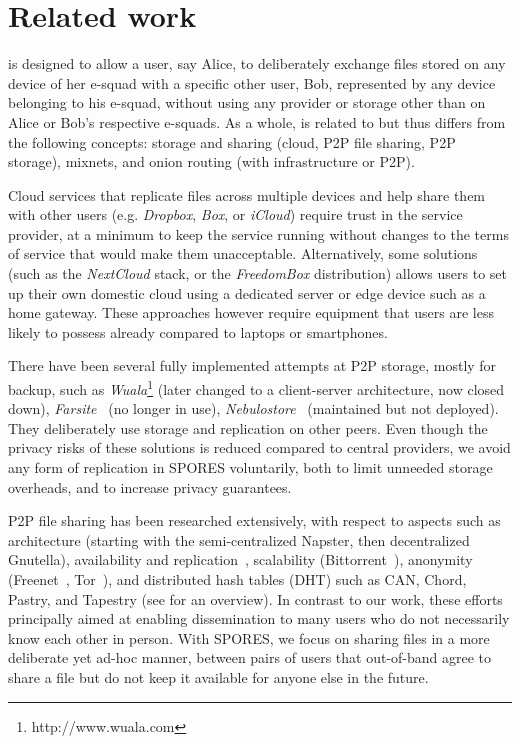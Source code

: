 \section{Related work}%
\label{RelatedWork}

\name is designed to allow a user, say Alice,  to deliberately exchange files stored on any device of her e-squad with a specific other user, Bob, represented by any device belonging to his e-squad, without using any provider or storage other than on Alice or Bob's respective e-squads. As a whole, \name is related to but thus differs from the following concepts: storage and sharing (cloud, P2P file sharing, P2P storage),  mixnets, and onion routing (with infrastructure or P2P).  

Cloud services that replicate files across multiple devices and help share them with other users (e.g. \emph{Dropbox}, \emph{Box}, or \emph{iCloud}) require trust in the service provider, at a minimum to keep the service running without changes to the terms of service that would make them unacceptable. Alternatively, some solutions (such as the \emph{NextCloud} stack, or the \emph{FreedomBox} distribution) allows users to set up their own domestic cloud using a dedicated server or edge device such as a home gateway. These approaches however require equipment that users are less likely to possess already compared to laptops or smartphones. 

There have been several fully implemented attempts at P2P storage, mostly for backup, such as \emph{Wuala}\footnote{http://www.wuala.com} (later changed to a client-server architecture, now closed down), \emph{Farsite}~\cite{farsite} (no longer in use), \emph{Nebulostore}~\cite{nebulo} (maintained but not deployed). They deliberately use storage and replication on other peers. Even though the privacy risks of these solutions is reduced compared to central providers, we avoid any form of replication in \ac{SPORES} voluntarily, both to limit unneeded storage overheads, and to increase privacy guarantees.

P2P file sharing has been researched extensively, with respect to aspects such as architecture (starting with the semi-centralized Napster, then decentralized Gnutella), availability and replication~\cite{replica}, scalability (Bittorrent~\cite{bittorrent-incentives}), anonymity (Freenet~\cite{Clarke:2001}, Tor~\cite{Tor}), and distributed hash tables (DHT) such as CAN, Chord, Pastry, and Tapestry (see \cite{dhtchurn} for an overview). In contrast to our work, these efforts principally aimed at enabling dissemination to many users who do not necessarily know each other in person. With \ac{SPORES}, we focus on sharing files in a more deliberate yet ad-hoc manner, \ie between pairs of users that out-of-band agree to share a file but do not keep it available for anyone else in the future. 

